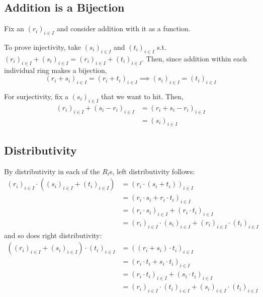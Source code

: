 \documentclass[12pt]{article}
\begin{document}
\subsection{Addition is a Bijection}

Fix an $(r_i)_{i \in I}$ and consider addition with it as a function.

To prove injectivity, take $(s_i)_{i \in I}$ and $(t_i)_{i \in I}$ s.t. $(r_i)_{i \in I}+(s_i)_{i \in I}=(r_i)_{i \in I}+(t_i)_{i \in I}$.
Then, since addition within each individual ring makes a bijection,
\[(r_i+s_i)_{i \in I}=(r_i+t_i)_{i \in I}
  \implies (s_i)_{i \in I}=(t_i)_{i \in I}\]

For surjectivity, fix a $(s_i)_{i \in I}$ that we want to hit.
Then,
\begin{align*}
  (r_i)_{i \in I}+(s_i-r_i)_{i \in I}
   & = (r_i+s_i-r_i)_{i \in I} \\
   & = (s_i)_{i \in I}
\end{align*}

\subsection{Distributivity}

By distributivity in each of the $R_i$s, left distributivity follows:
\begin{align*}
  (r_i)_{i \in I} \cdot ((s_i)_{i \in I}+(t_i)_{i \in I})
   & = (r_i \cdot (s_i+t_i))_{i \in I}                                         \\
   & = (r_i \cdot s_i+r_i \cdot t_i)_{i \in I}                                 \\
   & = (r_i \cdot s_i)_{i \in I}+(r_i \cdot t_i)_{i \in I}                     \\
   & = (r_i)_{i \in I}\cdot(s_i)_{i \in I}+(r_i)_{i \in I}\cdot(t_i)_{i \in I}
\end{align*}
and so does right distributivity:
\begin{align*}
  ((r_i)_{i \in I}+(s_i)_{i \in I})\cdot(t_i)_{i \in I}
   & = ((r_i+s_i)\cdot t_i)_{i \in I}                                          \\
   & = (r_i\cdot t_i+s_i\cdot t_i)_{i \in I}                                   \\
   & = (r_i\cdot t_i)_{i \in I}+(s_i\cdot t_i)_{i \in I}                       \\
   & = (r_i)_{i \in I}\cdot(t_i)_{i \in I}+(s_i)_{i \in I}\cdot(t_i)_{i \in I}
\end{align*}
\end{document}
